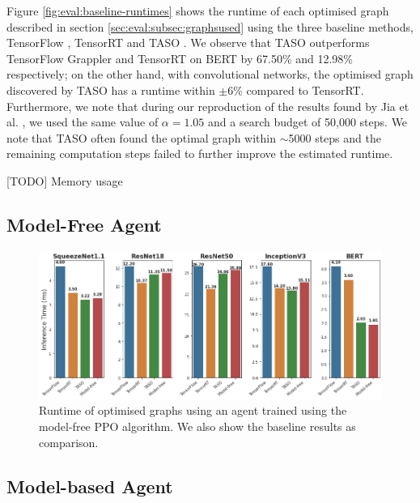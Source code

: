 Figure \ref{fig:eval:baseline-runtimes} shows the runtime of each optimised graph described in section \ref{sec:eval:subsec:graphsused} using the three baseline methods, TensorFlow \cite{tensorflow2015-whitepaper}, TensorRT \cite{tensorrt2017} and TASO \cite{jia2019taso}. We observe that TASO outperforms TensorFlow Grappler and TensorRT on BERT by 67.50\% and 12.98\% respectively; on the other hand, with convolutional networks, the optimised graph discovered by TASO has a runtime within $\pm 6$\% compared to TensorRT. Furthermore, we note that during our reproduction of the results found by Jia et al. \cite{jia2019taso}, we used the same value of $\alpha = 1.05$ and a search budget of 50,000 steps. We note that TASO often found the optimal graph within $\sim$5000 steps and the remaining computation steps failed to further improve the estimated runtime.

[TODO] Memory usage


\subsection{Model-Free Agent}
\label{sec:eval:subsec:mfagent}



\begin{figure}[ht]
  \centering
  \includegraphics[width=1\columnwidth]{sections/5evaluation/images/runtimes_mf.png}
  \caption[Runtimes of optimised graphs using a model-free agent]{Runtime of optimised graphs using an agent trained using the model-free PPO algorithm. We also show the baseline results as comparison.}
  \label{fig:eval:mf-agent-reward}
\end{figure}

\subsection{Model-based Agent}
\label{sec:eval:subsec:mbagent}

